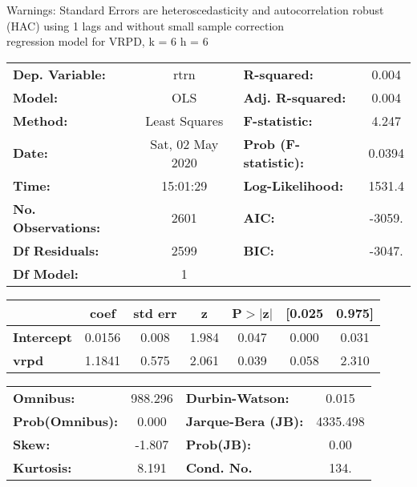 Warnings: \newline
 [1] Standard Errors are heteroscedasticity and autocorrelation robust (HAC) using 1 lags and without small sample correction\\ 

regression model for VRPD, k = 6 h = 6\begin{center}
\begin{tabular}{lclc}
\toprule
\textbf{Dep. Variable:}    &       rtrn       & \textbf{  R-squared:         } &     0.004   \\
\textbf{Model:}            &       OLS        & \textbf{  Adj. R-squared:    } &     0.004   \\
\textbf{Method:}           &  Least Squares   & \textbf{  F-statistic:       } &     4.247   \\
\textbf{Date:}             & Sat, 02 May 2020 & \textbf{  Prob (F-statistic):} &   0.0394    \\
\textbf{Time:}             &     15:01:29     & \textbf{  Log-Likelihood:    } &    1531.4   \\
\textbf{No. Observations:} &        2601      & \textbf{  AIC:               } &    -3059.   \\
\textbf{Df Residuals:}     &        2599      & \textbf{  BIC:               } &    -3047.   \\
\textbf{Df Model:}         &           1      & \textbf{                     } &             \\
\bottomrule
\end{tabular}
\begin{tabular}{lcccccc}
                   & \textbf{coef} & \textbf{std err} & \textbf{z} & \textbf{P$> |$z$|$} & \textbf{[0.025} & \textbf{0.975]}  \\
\midrule
\textbf{Intercept} &       0.0156  &        0.008     &     1.984  &         0.047        &        0.000    &        0.031     \\
\textbf{vrpd}      &       1.1841  &        0.575     &     2.061  &         0.039        &        0.058    &        2.310     \\
\bottomrule
\end{tabular}
\begin{tabular}{lclc}
\textbf{Omnibus:}       & 988.296 & \textbf{  Durbin-Watson:     } &    0.015  \\
\textbf{Prob(Omnibus):} &   0.000 & \textbf{  Jarque-Bera (JB):  } & 4335.498  \\
\textbf{Skew:}          &  -1.807 & \textbf{  Prob(JB):          } &     0.00  \\
\textbf{Kurtosis:}      &   8.191 & \textbf{  Cond. No.          } &     134.  \\
\bottomrule
\end{tabular}
\end{center}

